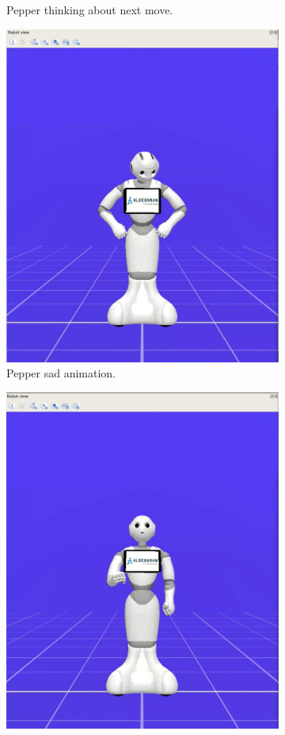 \documentclass{article}
\begin{document}
\begin{figure}[H]
\begin{subfigure}{.33\textwidth}
      \caption{Pepper thinking about next move.}
    \end{subfigure}%
    \begin{subfigure}{.33\textwidth}
      \centering
      \includegraphics[width=0.9\linewidth]{images/10_pepper triste(invalida,tempo,no gioco).png}
      \caption{Pepper sad animation. }
    \end{subfigure}%
    \begin{subfigure}{.33\textwidth}
      \centering
      \includegraphics[width=0.9\linewidth]{images/13_mossa di pepper.png}

\end{subfigure}
\end{figure}
\end{document}
